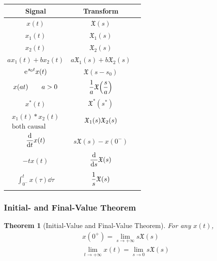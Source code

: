 \documentclass[10pt,UTF8]{article}
\makeatletter
\newenvironment{definition box}
{\begin{tcolorbox}[colback=blue!5!white,colframe=blue!75!black,parbox=false,before upper=\par,before lower=\par]}
{\end{tcolorbox}}
\newenvironment{theorem box}
{\begin{tcolorbox}[colback=yellow!5!white,colframe=yellow!75!black,parbox=false,before upper=\par,before lower=\par]}
{\end{tcolorbox}}
\theoremstyle{definition}
\newtheorem{definition inner}{Definition}[section]
\theoremstyle{plain}
\newtheorem{theorem inner}{Theorem}[section]
\newenvironment{theorem}[1][]
{\begin{theorem box}\begin{theorem inner}[#1]\hfill\par}
{\end{theorem inner}\end{theorem box}}
\theoremstyle{definition}
\newtheorem*{proof inner}{\textit{Proof}}
\theoremstyle{remark}
\newcommand{\mycases}[2][0.8]{
    \left\{\vphantom{\scalebox{#1}{
        $\begin{matrix}#2\end{matrix}$
    }}\right.\!\!\!\!
    \begin{array}{l@{\quad}l}#2\end{array}
}
\newcommand{\e}{\mathrm{e}{\mkern 1 mu}}
\makeatother
\begin{document}
\begin{center}
\begin{tabular}
    { c @{\qquad} c @{\qquad} c}
    Signal & Transform \\
    \hline $\displaystyle
    x(t)
    $ & $\displaystyle
    \mathfrak{X}(s)
    $ \\\hline $
    x_1(t)
    $ & $\displaystyle
    \mathfrak{X}_1(s)
    $ \\\hline $
    x_2(t)
    $ & $\displaystyle
    \mathfrak{X}_2(s)
    $ \\\hline $
    a x_1(t) + b x_2(t)
    $ & $\displaystyle
    a \mathfrak{X}_1(s) + b \mathfrak{X}_2(s)
    $ \\\hline $\displaystyle
    \e^{s_0 t} x(t)
    $ & $\displaystyle
    \mathfrak{X}(s-s_0)
    $ \\\hline $\displaystyle
    x(a t) \qquad a>0 \vphantom{\mycases{1\\1}}
    $ & $\displaystyle
    \frac{1}{a} \mathfrak{X}\qty(\frac{s}{a})
    $ \\\hline $
    x^*(t)
    $ & $\displaystyle
    \mathfrak{X}^*(s^*)
    $ \\\hline $
    \begin{matrix}
        x_1(t) \ast x_2(t) \\
        \text{both causal}
    \end{matrix}
    $ & $\displaystyle
    \mathfrak{X}_1(s) \mathfrak{X}_2(s) \vphantom{\mycases{1\\1}}
    $ \\\hline $\displaystyle
    \dv{t} x(t) \vphantom{\mycases{1\\1}}
    $ & $\displaystyle
    s \mathfrak{X}(s) - x(0^-)
    $ \\\hline $\displaystyle
    -t x(t)
    $ & $\displaystyle
    \dv{s} \mathfrak{X}(s) \vphantom{\mycases{1\\1}}
    $ \\\hline $\displaystyle
    \int_{0^-}^t x(\tau)\dd{\tau}
    $ & $\displaystyle
    \frac{1}{s} \mathfrak{X}(s) \vphantom{\mycases{1\\1}}
    $ \\\hline
\end{tabular}
\end{center}

\subsubsection{Initial- and Final-Value Theorem}
\begin{theorem}[Initial-Value and Final-Value Theorem]
    For any $x(t)$,
    \begin{gather*}
        x(0^+) = \lim_{s\to+\infty} s \mathfrak{X}(s) \\
        \lim_{t\to+\infty} x(t) = \lim_{s\to 0} s \mathfrak{X}(s)
    \end{gather*}
\end{theorem}
\end{document}
